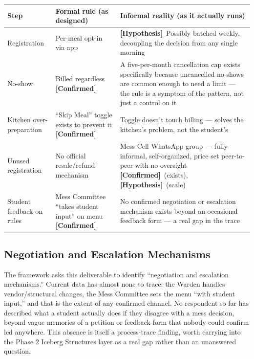 \documentclass[11pt]{article}
\newcommand{\confirmed}{\textbf{[Confirmed]}}
\newcommand{\hypo}{\textbf{[Hypothesis]}}
\begin{document}
\begin{longtable}{L{0.2\textwidth}L{0.35\textwidth}L{0.35\textwidth}}
\toprule
\textbf{Step} & \textbf{Formal rule (as designed)} & \textbf{Informal reality (as it
actually runs)} \\
\midrule
\endhead
Registration & Per-meal opt-in via app & \hypo\ Possibly batched weekly, decoupling
the decision from any single morning \\[6pt]

No-show & Billed regardless \confirmed & A five-per-month cancellation cap exists
specifically because uncancelled no-shows are common enough to need a limit --- the
rule is a symptom of the pattern, not just a control on it \\[6pt]

Kitchen over-preparation & ``Skip Meal'' toggle exists to prevent it \confirmed &
Toggle doesn't touch billing --- solves the kitchen's problem, not the student's \\[6pt]

Unused registration & No official resale/refund mechanism & Mess Cell WhatsApp group
--- fully informal, self-organized, price set peer-to-peer with no oversight
\confirmed\ (exists), \hypo\ (scale) \\[6pt]

Student feedback on rules & Mess Committee ``takes student input'' on menu
\confirmed & No confirmed negotiation or escalation mechanism exists beyond an
occasional feedback form --- a real gap in the trace \\
\bottomrule
\end{longtable}

\subsection{Negotiation and Escalation Mechanisms}

The framework asks this deliverable to identify ``negotiation and escalation
mechanisms.'' Current data has almost none to trace: the Warden handles
vendor/structural changes, the Mess Committee sets the menu ``with student input,''
and that is the extent of any confirmed channel. No respondent so far has described
what a student actually does if they disagree with a mess decision, beyond vague
memories of a petition or feedback form that nobody could confirm led anywhere. This
absence is itself a process-trace finding, worth carrying into the Phase 2 Iceberg
Structures layer as a real gap rather than an unanswered question.
\end{document}
